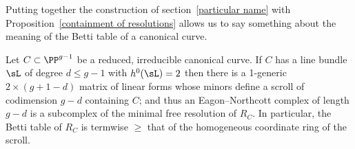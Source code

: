 %
%
%
Putting together the construction of section~\ref{particular name} with
Proposition~\ref{containment of resolutions} allows us to say
something about the meaning of the Betti table of a canonical curve.

\begin{theorem}
Let $C\subset \PP^{g-1}$ be a reduced, irreducible canonical curve. If
$C$ has a line bundle $\sL$ of degree $d \leq g-1$ with $h^0(\sL) =
2$  then
there is a 1-generic  $2\times (g+1-d)$ matrix of linear forms whose
minors define a scroll of codimension $g-d$ containing $C$; and thus an
Eagon--Northcott complex of length $g-d$ is a subcomplex of the minimal
free resolution of $R_C$. In particular, the Betti table of $R_C$ is
%
termwise $\geq$ that of the homogeneous coordinate ring of the scroll.
\unif
\end{theorem}


